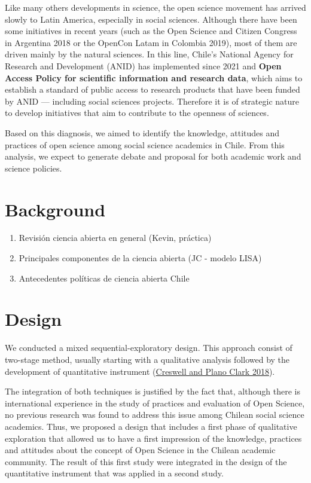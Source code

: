 \documentclass[
  letterpaper,
  DIV=11,
  numbers=noendperiod]{scrartcl}
\begin{document}
Like many others developments in science, the open science movement has
arrived slowly to Latin America, especially in social sciences. Although
there have been some initiatives in recent years (such as the Open
Science and Citizen Congress in Argentina 2018 or the OpenCon Latam in
Colombia 2019), most of them are driven mainly by the natural sciences.
In this line, Chile's National Agency for Research and Development
(ANID) has implemented since 2021 and \textbf{Open Access Policy for
scientific information and research data}, which aims to establish a
standard of public access to research products that have been funded by
ANID --- including social sciences projects. Therefore it is of
strategic nature to develop initiatives that aim to contribute to the
openness of sciences.

Based on this diagnosis, we aimed to identify the knowledge, attitudes
and practices of open science among social science academics in Chile.
From this analysis, we expect to generate debate and proposal for both
academic work and science policies.

\hypertarget{background}{%
\section{Background}\label{background}}

\begin{enumerate}
\def\labelenumi{\alph{enumi})}
\item
  Revisión ciencia abierta en general (Kevin, práctica)
\item
  Principales componentes de la ciencia abierta (JC - modelo LISA)
\item
  Antecedentes políticas de ciencia abierta Chile
\end{enumerate}

\hypertarget{design}{%
\section{Design}\label{design}}

We conducted a mixed sequential-exploratory design. This approach
consist of two-stage method, usually starting with a qualitative
analysis followed by the development of quantitative instrument
(\protect\hyperlink{ref-creswell_designing_2018}{Creswell and Plano
Clark 2018}).

The integration of both techniques is justified by the fact that,
although there is international experience in the study of practices and
evaluation of Open Science, no previous research was found to address
this issue among Chilean social science academics. Thus, we proposed a
design that includes a first phase of qualitative exploration that
allowed us to have a first impression of the knowledge, practices and
attitudes about the concept of Open Science in the Chilean academic
community. The result of this first study were integrated in the design
of the quantitative instrument that was applied in a second study.
\end{document}
